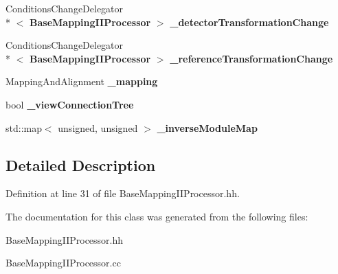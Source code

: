 \begin{DoxyCompactItemize}
\item 
Conditions\-Change\-Delegator\\*
$<$ {\bf Base\-Mapping\-I\-I\-Processor} $>$ {\bfseries \-\_\-detector\-Transformation\-Change}\label{classCALICE_1_1BaseMappingIIProcessor_abd2368662503bb079b2e60e10c5ff77f}

\item 
Conditions\-Change\-Delegator\\*
$<$ {\bf Base\-Mapping\-I\-I\-Processor} $>$ {\bfseries \-\_\-reference\-Transformation\-Change}\label{classCALICE_1_1BaseMappingIIProcessor_a265f357118f9770bf12edf8c4144338f}

\item 
Mapping\-And\-Alignment {\bfseries \-\_\-mapping}\label{classCALICE_1_1BaseMappingIIProcessor_a41bfff962f24cc68687dcf4b482db560}

\item 
bool {\bfseries \-\_\-view\-Connection\-Tree}\label{classCALICE_1_1BaseMappingIIProcessor_ae06d06bfae0591fb5f89b749f476af13}

\item 
std\-::map$<$ unsigned, unsigned $>$ {\bfseries \-\_\-inverse\-Module\-Map}\label{classCALICE_1_1BaseMappingIIProcessor_aa4baf288fa623c98ec56a5c97e2b6b08}

\end{DoxyCompactItemize}


\subsection{Detailed Description}


Definition at line 31 of file Base\-Mapping\-I\-I\-Processor.\-hh.



The documentation for this class was generated from the following files\-:\begin{DoxyCompactItemize}
\item 
Base\-Mapping\-I\-I\-Processor.\-hh\item 
Base\-Mapping\-I\-I\-Processor.\-cc\end{DoxyCompactItemize}
